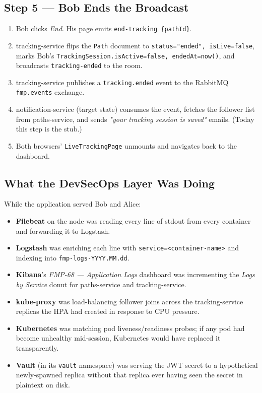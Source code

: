 \documentclass[11pt,a4paper]{article}
\begin{document}
\subsection{Step 5 — Bob Ends the Broadcast}
\begin{enumerate}[leftmargin=*]
  \item Bob clicks \emph{End}.  His page emits
        \texttt{end-tracking \{pathId\}}.
  \item tracking-service flips the \texttt{Path} document to
        \texttt{status="ended", isLive=false}, marks Bob's
        \texttt{TrackingSession.isActive=false, endedAt=now()},
        and broadcasts \texttt{tracking-ended} to the room.
  \item tracking-service publishes a \texttt{tracking.ended}
        event to the RabbitMQ \texttt{fmp.events} exchange.
  \item notification-service (target state) consumes the event,
        fetches the follower list from paths-service, and sends
        \emph{"your tracking session is saved"} emails.  (Today
        this step is the stub.)
  \item Both browsers' \texttt{LiveTrackingPage} unmounts and
        navigates back to the dashboard.
\end{enumerate}

\subsection{What the DevSecOps Layer Was Doing}
While the application served Bob and Alice:

\begin{itemize}[leftmargin=*]
  \item \textbf{Filebeat} on the node was reading every line of
        stdout from every container and forwarding it to Logstash.
  \item \textbf{Logstash} was enriching each line with
        \texttt{service=<container-name>} and indexing into
        \texttt{fmp-logs-YYYY.MM.dd}.
  \item \textbf{Kibana}'s \emph{FMP-68 — Application Logs}
        dashboard was incrementing the \emph{Logs by Service}
        donut for paths-service and tracking-service.
  \item \textbf{kube-proxy} was load-balancing follower joins
        across the tracking-service replicas the HPA had created
        in response to CPU pressure.
  \item \textbf{Kubernetes} was matching pod liveness/readiness
        probes; if any pod had become unhealthy mid-session,
        Kubernetes would have replaced it transparently.
  \item \textbf{Vault} (in its \texttt{vault} namespace) was
        serving the JWT secret to a hypothetical newly-spawned
        replica without that replica ever having seen the secret
        in plaintext on disk.
\end{itemize}
\end{document}
